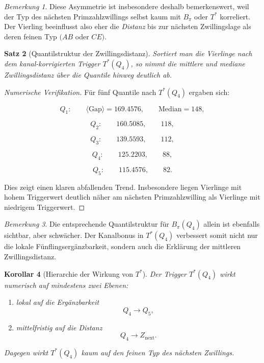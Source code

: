 \documentclass[11pt,a4paper]{article}
\newtheorem{satz}{Satz}
\newtheorem{korollar}[satz]{Korollar}
\theoremstyle{definition}
\theoremstyle{remark}
\newtheorem{bemerkung}[satz]{Bemerkung}
\begin{document}
	\begin{bemerkung}
		Diese Asymmetrie ist insbesondere deshalb bemerkenswert, weil der Typ des nächsten
		Primzahlzwillings selbst kaum mit \(B_\pi\) oder \(T^*\) korreliert. Der Vierling beeinflusst
		also eher die \emph{Distanz} bis zur nächsten Zwillingslage als deren feinen Typ
		\((AB\) oder \(CE)\).
	\end{bemerkung}
	
	\begin{satz}[Quantilstruktur der Zwillingsdistanz]
		\label{satz:quantile_zwillingsdistanz}
		Sortiert man die Vierlinge nach dem kanal-korrigierten Trigger \(T^*(Q_4)\), so nimmt die
		mittlere und mediane Zwillingsdistanz über die Quantile hinweg deutlich ab.
	\end{satz}
	
	\begin{proof}[Numerische Verifikation]
		Für fünf Quantile nach \(T^*(Q_4)\) ergaben sich:
		
		\[
		Q_1:
		\qquad
		\langle \mathrm{Gap}\rangle = 169.4576,
		\qquad
		\mathrm{Median} = 148,
		\]
		
		\[
		Q_2:
		\qquad
		160.5085,
		\qquad
		118,
		\]
		
		\[
		Q_3:
		\qquad
		139.5593,
		\qquad
		112,
		\]
		
		\[
		Q_4:
		\qquad
		125.2203,
		\qquad
		88,
		\]
		
		\[
		Q_5:
		\qquad
		115.4576,
		\qquad
		82.
		\]
		
		Dies zeigt einen klaren abfallenden Trend. Insbesondere liegen Vierlinge mit hohem
		Triggerwert deutlich näher am nächsten Primzahlzwilling als Vierlinge mit niedrigem
		Triggerwert.
	\end{proof}
	
	\begin{bemerkung}
		Die entsprechende Quantilstruktur für \(B_\pi(Q_4)\) allein ist ebenfalls sichtbar, aber
		schwächer. Der Kanalbonus in \(T^*(Q_4)\) verbessert somit nicht nur die lokale
		Fünflingsergänzbarkeit, sondern auch die Erklärung der mittleren Zwillingsdistanz.
	\end{bemerkung}
	
	\begin{korollar}[Hierarchie der Wirkung von \(T^*\)]
		\label{kor:hierarchie_triggerwirkung}
		Der Trigger \(T^*(Q_4)\) wirkt numerisch auf mindestens zwei Ebenen:
		
		\begin{enumerate}
			\item lokal auf die Ergänzbarkeit
			\[
			Q_4\to Q_5,
			\]
			\item mittelfristig auf die Distanz
			\[
			Q_4\to Z_{\mathrm{next}}.
			\]
		\end{enumerate}
		
		Dagegen wirkt \(T^*(Q_4)\) kaum auf den feinen Typ des nächsten Zwillings.
	\end{korollar}
	
\end{document}
